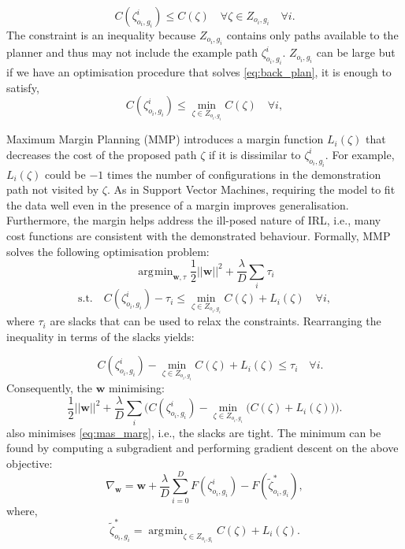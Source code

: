 \documentclass{article}  %
\DeclareMathOperator*{\argmin}{\arg\!\min}
\begin{document}
\begin{equation}
	C(\zeta^i_{o_i,g_i}) \leq  C(\zeta) \quad \forall \zeta \in Z_{o_i,g_i}  \quad \forall i. \label{eq:const1}
\end{equation}
The constraint is an inequality because $Z_{o_i,g_i}$ contains only paths available to the planner and thus may not include the example path $\zeta^i_{o_i,g_i}$.
$Z_{o_i,g_i}$ can be large but if we have an optimisation procedure that solves \eqref{eq:back_plan}, it is enough to satisfy, 
\begin{equation}
	C(\zeta^i_{o_i,g_i}) \leq \min_{\zeta \in Z_{o_i,g_i}} C(\zeta) \quad \forall i, \label{eq:const}
\end{equation}

Maximum Margin Planning (MMP) \cite{ratliff2006maximum} introduces a margin function $L_i(\zeta)$ that decreases the cost of the proposed path $\zeta$ if it is dissimilar to $\zeta^i_{o_i,g_i}$. For example, $L_i(\zeta)$ could be $-1$ times the number of configurations in the demonstration path not visited by $\zeta$. As in Support Vector Machines, requiring the model to fit the data well even in the presence of a margin improves generalisation. Furthermore, the margin helps address the ill-posed nature of IRL, i.e., many cost functions are consistent with the demonstrated behaviour. Formally, MMP solves the following optimisation problem:
\begin{equation}
	\argmin_{\mathbf{w},\tau} \frac{1}{2}||\mathbf{w}||^2 + \frac{\lambda}{D} \sum_i \tau_i \label{eq:mas_marg}
\end{equation}
\begin{equation}
	\text{s.t.} \quad C(\zeta^i_{o_i,g_i}) - \tau_i \leq \min_{\zeta \in Z_{o_i,g_i}} C(\zeta) + L_i(\zeta) \quad \forall i,
\end{equation}
where $\tau_i$ are slacks that can be used to relax the constraints. Rearranging the inequality in terms of the slacks yields:

\begin{equation}
	 \quad C(\zeta^i_{o_i,g_i}) - \min_{\zeta \in Z_{o_i,g_i}} C(\zeta) + L_i(\zeta)  \leq \tau_i  \quad \forall i.
\end{equation}
Consequently, the $\mathbf{w}$ minimising:
\begin{equation}
	\frac{1}{2}||\mathbf{w}||^2 + \frac{\lambda}{D} \sum_i \big( C(\zeta^i_{o_i,g_i}) - \min_{\zeta \in Z_{o_i,g_i}}\big(C(\zeta) + L_i(\zeta)\big) \big) \big. \label{eq:unconstrained}
\end{equation}
also minimises \eqref{eq:mas_marg}, i.e., the slacks are tight.
The minimum can be found by computing a subgradient and performing gradient descent on the above objective:
\begin{equation}
	\nabla_{\mathbf{w}} =\mathbf{w} +  \frac{\lambda}{D} \sum_{i=0}^D F(\zeta^i_{o_i,g_i}) - F(\tilde{\zeta}^*_{o_i,g_i}), \label{eq:update1}
\end{equation}
where,
\begin{equation}
	\tilde{\zeta}^*_{o_i,g_i} = \argmin_{\zeta \in Z_{o_i,g_i}} C(\zeta) + L_i(\zeta). \label{eq:augmented_max}
\end{equation}
\end{document}
